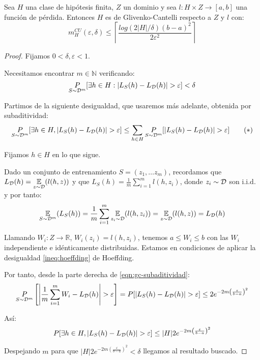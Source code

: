   
\begin{fact}
Sea $H$ una clase de hipótesis finita, $Z$ un dominio y sea $l : H \times Z \rightarrow [a,b]$ una función de pérdida.
Entonces $H$ es de Glivenko-Cantelli respecto a $Z$ y $l$ con:
\[
  m_{H}^{CU}(\varepsilon, \delta) \le \left\lceil \frac{log(2|H|/\delta)(b-a)^2}{2\varepsilon^2} \right\rceil
\]
\label{fact:finitas-gc}
\end{fact}
  \begin{proof}
  Fijamos $0 < \delta, \varepsilon < 1$. 
  
  Necesitamos encontrar $m\in \mathbb{N}$ verificando:
  \[
    \underset{S\sim \mathcal{D}^m}{P} [\exists h\in H : |L_S(h) - L_{\mathcal{D}}(h)| > \varepsilon] < \delta
  \]

  Partimos de la siguiente desigualdad, que usaremos más adelante, obtenida por subaditividad:
  \begin{equation}
  \underset{S\sim \mathcal{D}^m}{P} [\exists h\in H, |L_S(h) - L_{\mathcal{D}}(h)| > \varepsilon] \le 
  \sum_{h \in H} \underset{S\sim \mathcal{D}^m}{P} [|L_S(h) - L_{\mathcal{D}}(h)| > \varepsilon]
  \label{eqn:gc-subaditividad}\tag{$\ast$}
  \end{equation}

  Fijamos $h \in H$ en lo que sigue.

  Dado un conjunto de entrenamiento $S = (z_1, \ldots z_m)$, recordamos que 
  $L_{\mathcal{D}} (h) = \underset{z\sim \mathcal{D}}{\mathbb{E}} (l(h,z))$ y que $L_{S}(h) = \frac{1}{m} \sum_{i=1}^m l(h,z_i)$, donde $z_i \sim \mathcal{D}$ son i.i.d.
  y por tanto:
  \[
    \underset{S\sim \mathcal{D}^m}{\mathbb{E}} (L_S(h)) = \frac{1}{m} \sum_{i=1}^m \underset{z_i\sim \mathcal{D}} {\mathbb{E}}(l(h,z_i)) =  \underset{z\sim \mathcal{D}}{\mathbb{E}} (l(h,z)) = L_{\mathcal{D}} (h)
  \] 
  
  Llamando $W_i:Z \rightarrow \mathbb{R}$, $W_i (z_i) = l(h,z_i)$, tenemos $a \le W_i \le b$
  con las $W_i$ independiente e idénticamente distribuidas. Estamos en condiciones de aplicar la desigualdad \ref{ineq:hoeffding} de Hoeffding.

  Por tanto, desde la parte derecha de \eqref{eqn:gc-subaditividad}:
  \[
    \underset{S\sim \mathcal{D}^m}{P} \left[\left| \frac{1}{m} \sum_{i=1}^m W_i - L_{\mathcal{D}} (h) \right| > \varepsilon\right] = 
    P [|L_S(h) - L_{\mathcal{D}}(h)| > \varepsilon] \le 2e^{-2m \left( \frac{\varepsilon}{b-a} \right)^2}
  \]

  Así:
  \[
    P [\exists h\in H, |L_S(h) - L_{\mathcal{D}}(h)| > \varepsilon] \le 
    |H| 2e^{-2m \left( \frac{\varepsilon}{b-a} \right)^2}
  \]

  Despejando $m$ para que $|H| 2e^{-2m \left( \frac{\varepsilon}{b-a} \right)^2} < \delta$ 
  llegamos al resultado buscado.
  \end{proof}

